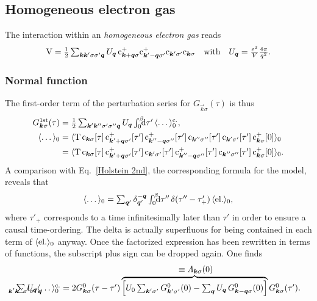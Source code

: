 \subsection{Homogeneous electron gas}

The interaction within an \emph{homogeneous electron gas} reads
\cite[165]{Czycholl08}
%
\begin{align*}
    \op V = \frac 1 2 \sum_{\vec k \vec k' \sigma \sigma' \vec q} U_{\vec q} \,
    \op c_{\vec k + \vec q \sigma}^+
    \op c_{\vec k' - \vec q \sigma'}^+
    \op c_{\vec k' \sigma'}
    \op c_{\vec k \sigma}
    \quad \text{with} \quad
    U_{\vec q} = \frac{e^2}{V} \frac{4 \pi}{q^2}.
\end{align*}

\subsubsection{Normal  function}

The first-order term of the  perturbation series for
$G_{\vec k \sigma}(\tau)$ is thus
%
\begin{align*}
    G \super{1st}_{\vec k \sigma}(\tau) &= \frac 1 2
    \sum_{\vec k' \vec k'' \sigma' \sigma'' \vec q} U_{\vec q}
    \int \from 0 \till \beta \D \tau' \, \av \dots_0 \super{c.},
    \\
    \av \dots_0 &= \av{\op T \,
        \op c_{\vec k \sigma}[\tau] \,
        \op c_{\vec k' + \vec q \sigma'}^+[\tau'] \,
        \op c_{\vec k'' - \vec q \sigma''}^+[\tau'] \,
        \op c_{\vec k'' \sigma''}[\tau'] \,
        \op c_{\vec k' \sigma'}[\tau'] \,
        \op c_{\vec k \sigma}^+[0]
    }_0 \\ &= \av{\op T \,
        \op c_{\vec k \sigma}[\tau] \,
        \op c_{\vec k' + \vec q \sigma'}^+[\tau'] \,
        \op c_{\vec k' \sigma'}[\tau'] \,
        \op c_{\vec k'' - \vec q \sigma''}^+[\tau'] \,
        \op c_{\vec k'' \sigma''}[\tau'] \,
        \op c_{\vec k \sigma}^+[0]
    }_0.
\end{align*}
%
A comparison with Eq.~\ref{Holstein 2nd}, the corresponding formula for the
 model, reveals that
%
\begin{align*}
    \av \dots_0 =
    \sum_{\vec q'} \delta_{\vec q'}^{-\vec q}
    \int \from 0 \till \beta \D \tau'' \,
    \delta(\tau'' - \tau'_+) \, \av{\text{el.}}_0,
\end{align*}
%
where $\tau'_+$ corresponds to a time infinitesimally later than $\tau'$ in
order to ensure a causal time-ordering. The  delta is actually
superfluous for being contained in each term of $\langle\text{el.}\rangle_0$ anyway. Once
the factorized expression has been rewritten in terms of  functions,
the subscript plus sign can be dropped again. One finds
%
\begin{align*}
    \sum_{\mathclap{\vec k' \vec k'' \sigma' \sigma'' \vec q}}
    U_{\vec q} \av \dots_0 \super{c.} =
    2 G^0_{\vec k \sigma}(\tau - \tau')
    \hyper{\Big[
        U_0 \sum_{\vec k' \sigma'} G^0_{\vec k' \sigma'}(0) -
        \sum_{\vec q} U_{\vec q} \, G^0_{\vec k - \vec q \sigma}(0)
    \Big]}{\equiv \Lambda_{\vec k \sigma}(0)}
    G^0_{\vec k \sigma}(\tau').
\end{align*}

